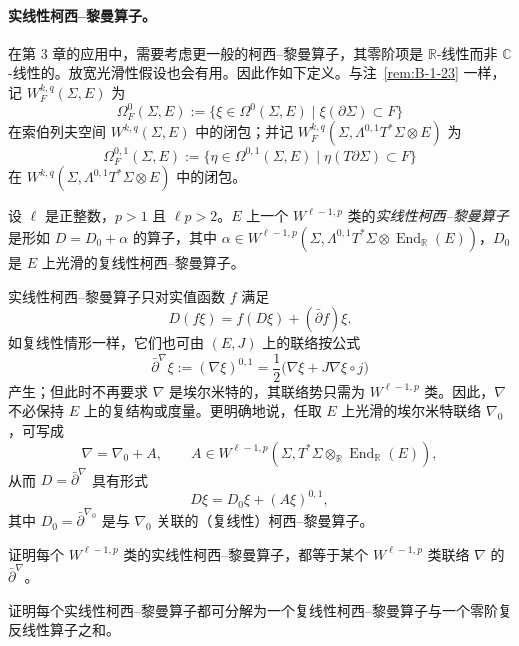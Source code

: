 \paragraph{实线性柯西–黎曼算子。} 在第 3 章的应用中，需要考虑更一般的柯西–黎曼算子，其零阶项是 $\mathbb R$-线性而非 $\mathbb C$-线性的。放宽光滑性假设也会有用。因此作如下定义。与注~\ref{rem:B-1-23} 一样，记 $W_F^{k,q}(\Sigma,E)$ 为
\[
  \Omega_F^0(\Sigma,E):=\{\xi\in\Omega^0(\Sigma,E)\mid\xi(\partial\Sigma)\subset F\}
\]
在索伯列夫空间 $W^{k,q}(\Sigma,E)$ 中的闭包；并记 $W_F^{k,q}(\Sigma,\Lambda^{0,1}T^*\Sigma\otimes E)$ 为
\[
  \Omega_F^{0,1}(\Sigma,E)
  :=\{\eta\in\Omega^{0,1}(\Sigma,E)\mid\eta(T\partial\Sigma)\subset F\}
\]
在 $W^{k,q}(\Sigma,\Lambda^{0,1}T^*\Sigma\otimes E)$ 中的闭包。

\begin{definition}\label{def:C-1-5}
设 $\ell$ 是正整数，$p>1$ 且 $\ell p>2$。$E$ 上一个 $W^{\ell-1,p}$ 类的\emph{实线性柯西–黎曼算子}是形如 $D=D_0+\alpha$ 的算子，其中 $\alpha\in W^{\ell-1,p}(\Sigma,\Lambda^{0,1}T^*\Sigma\otimes\operatorname{End}_{\mathbb R}(E))$，$D_0$ 是 $E$ 上光滑的复线性柯西–黎曼算子。
\end{definition}

实线性柯西–黎曼算子只对实值函数 $f$ 满足
\[
  D(f\xi)=f(D\xi)+(\bar\partial f)\xi.
\]
如复线性情形一样，它们也可由 $(E,J)$ 上的联络按公式
\[
  \bar\partial^\nabla\xi:=(\nabla\xi)^{0,1}
  =\frac12\bigl(\nabla\xi+J\nabla\xi\circ j\bigr)
\]
产生；但此时不再要求 $\nabla$ 是埃尔米特的，其联络势只需为 $W^{\ell-1,p}$ 类。因此，$\nabla$ 不必保持 $E$ 上的复结构或度量。更明确地说，任取 $E$ 上光滑的埃尔米特联络 $\nabla_0$，可写成
\[
  \nabla=\nabla_0+A,\qquad
  A\in W^{\ell-1,p}(\Sigma,T^*\Sigma\otimes_{\mathbb R}\operatorname{End}_{\mathbb R}(E)),
\]
从而 $D=\bar\partial^\nabla$ 具有形式
\[
  D\xi=D_0\xi+(A\xi)^{0,1},
\]
其中 $D_0=\bar\partial^{\nabla_0}$ 是与 $\nabla_0$ 关联的（复线性）柯西–黎曼算子。

\begin{exercise}\label{ex:C-1-6}
证明每个 $W^{\ell-1,p}$ 类的实线性柯西–黎曼算子，都等于某个 $W^{\ell-1,p}$ 类联络 $\nabla$ 的 $\bar\partial^\nabla$。
\end{exercise}

\begin{exercise}\label{ex:C-1-7}
证明每个实线性柯西–黎曼算子都可分解为一个复线性柯西–黎曼算子与一个零阶复反线性算子之和。
\end{exercise}

